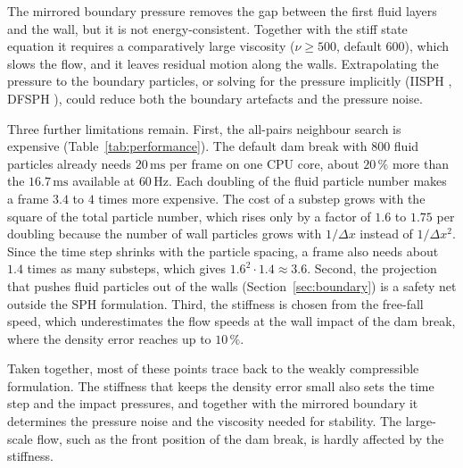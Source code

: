 The mirrored boundary pressure removes the gap between the
first fluid layers and the wall, but it is not energy-consistent. Together with
the stiff state equation it requires a comparatively large viscosity
($\nu \ge 500$, default $600$), which slows the flow, and it leaves residual motion along the
walls. Extrapolating the pressure to the boundary particles, or solving for the pressure implicitly (IISPH \cite{ihmsen2014iisph},
DFSPH \cite{bender2015}), could reduce both the boundary artefacts and the pressure noise.

Three further limitations remain. First, the all-pairs neighbour search is
expensive (Table~\ref{tab:performance}). The default dam break with 800 fluid
particles already needs $20\,\mathrm{ms}$ per frame on one CPU core, about
$20\,\%$ more than the $16.7\,\mathrm{ms}$ available at $60\,\mathrm{Hz}$. Each
doubling of the fluid particle number makes a frame $3.4$ to $4$ times more
expensive. The cost of a substep grows with the square of the total particle
number, which rises only by a factor of $1.6$ to $1.75$ per doubling because the
number of wall particles grows with $1/\Delta x$ instead of $1/\Delta x^2$.
Since the time step shrinks with the particle spacing, a frame also needs about
$1.4$ times as many substeps, which gives $1.6^2 \cdot 1.4 \approx 3.6$. Second, the projection that pushes fluid particles
out of the walls (Section~\ref{sec:boundary}) is a safety net outside the SPH
formulation. Third, the stiffness is chosen from the free-fall speed, which
underestimates the flow speeds at the wall impact of the dam break, where the
density error reaches up to $10\,\%$.

Taken together, most of these points trace back to the weakly compressible
formulation. The stiffness that keeps the density error small also sets the
time step and the impact pressures, and together with the mirrored boundary it
determines the pressure noise and the viscosity needed for stability. The
large-scale flow, such as the front position of the dam break, is hardly
affected by the stiffness.
